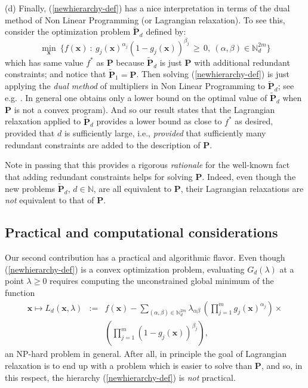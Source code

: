 \documentclass[11pt]{article}
\numberwithin{equation}{section}
\def\x{\mathbf{x}}
\def\N{\mathbb{N}}
\def\P{\mathbf{P}}
\begin{document}
(d) Finally, (\ref{newhierarchy-def}) has a nice interpretation in terms of the dual method of Non Linear Programming
(or Lagrangian relaxation). To see this, consider the optimization problem $\tilde{\P}_d$ defined by:
\begin{equation}
\label{pbtildeP}
\min_\x\:\{f(\x)\::\:g_j(\x)^{\alpha_j}(1-g_j(\x))^{\beta_j}\,\geq\,0,\:
(\alpha,\beta)\in\N^{2m}_{d}\}\end{equation}
which has same value $f^*$ as $\P$ because $\tilde{\P}_d$ is just $\P$ with additional redundant constraints;
and notice that $\tilde{\P}_1=\P$.
Then solving (\ref{newhierarchy-def}) is just applying the {\it dual method} of multipliers in Non Linear Programming to $\tilde{\P}_d$; see e.g. \cite[Chapter 8]{bertsekas}. In general one obtains only a lower bound
on the optimal value of $\tilde{\P}_d$ when $\P$ is not a convex program).
And so our result states that the Lagrangian relaxation applied to $\tilde{\P}_d$ provides a lower bound as close to $f^*$ as desired, provided that
$d$ is sufficiently large, i.e., {\em provided} that sufficiently many redundant constraints are added to the description of $\P$.

Note in passing that this provides a rigorous {\em rationale} for the well-known fact that
adding redundant constraints helps for solving $\P$. Indeed, even though the new problems $\tilde{\P}_d$, $d\in\N$,
are all equivalent to $\P$, their Lagrangian relaxations are {\it not} equivalent to that of $\P$.

\subsection*{Practical and computational considerations}

Our second contribution has a practical and algorithmic flavor. Even though (\ref{newhierarchy-def}) is a convex optimization problem,
evaluating $G_d(\lambda)$ at a point $\lambda\geq0$ requires computing the unconstrained global minimum
of the function
\begin{eqnarray}
\nonumber
\x\mapsto L_d(\x,\lambda)&:=& f(\x)-\sum_{(\alpha,\beta)\in\N^{2m}_{d}}\lambda_{\alpha\beta}\,\left(\prod_{j=1}^mg_j(\x)^{\alpha_j}\right)
\times\\
\label{functionL}
&&\left(\prod_{j=1}^m(1-g_j(\x))^{\beta_j}\right),\end{eqnarray}
an NP-hard problem in general. After all, in principle the goal of Lagrangian relaxation is to end up with a problem which is easier to solve than $\P$,
and so, in this respect, the hierarchy (\ref{newhierarchy-def}) is {\it not} practical. 
\end{document}
